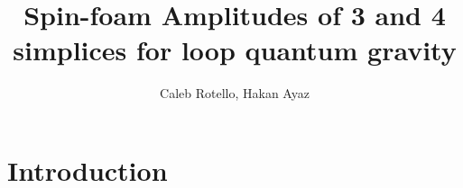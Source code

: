 \documentclass[12pt]{article}
\begin{document}
\title{\titlefont\vspace{-10ex}Spin-foam Amplitudes of 3 and 4 simplices for loop quantum gravity\vspace{-2ex}}
\author{\vspace{-10ex} Caleb Rotello, Hakan Ayaz}
\maketitle



\section{Introduction}\label{intro}

{}
\end{document}
